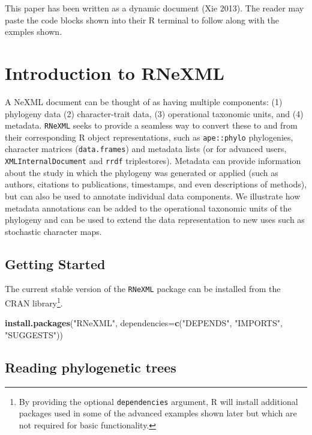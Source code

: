 \documentclass[author-year, review, 11pt]{components/elsarticle} %
\newenvironment{Shaded}{\begin{snugshade}}{\end{snugshade}}
\newcommand{\KeywordTok}[1]{\textcolor[rgb]{0.13,0.29,0.53}{\textbf{{#1}}}}
\newcommand{\DataTypeTok}[1]{\textcolor[rgb]{0.13,0.29,0.53}{{#1}}}
\newcommand{\StringTok}[1]{\textcolor[rgb]{0.31,0.60,0.02}{{#1}}}
\newcommand{\NormalTok}[1]{{#1}}
\begin{document}
This paper has been written as a dynamic document (Xie 2013). The reader
may paste the code blocks shown into their R terminal to follow along
with the exmples shown.

\section{Introduction to RNeXML}\label{introduction-to-rnexml}

A NeXML document can be thought of as having multiple components: (1)
phylogeny data (2) character-trait data, (3) operational taxonomic
units, and (4) metadata. \texttt{RNeXML} seeks to provide a seamless way
to convert these to and from their corresponding R object
representations, such as \texttt{ape::phylo} phylogenies, character
matrices (\texttt{data.frames}) and metadata lists (or for advanced
users, \texttt{XMLInternalDocument} and \texttt{rrdf} triplestores).
Metadata can provide information about the study in which the phylogeny
was generated or applied (such as authors, citations to publications,
timestamps, and even descriptions of methods), but can also be used to
annotate individual data components. We illustrate how metadata
annotations can be added to the operational taxonomic units of the
phylogeny and can be used to extend the data representation to new uses
such as stochastic character maps.

\subsection{Getting Started}\label{getting-started}

The current stable version of the \texttt{RNeXML} package can be
installed from the CRAN library\footnote{By providing the optional
  \texttt{dependencies} argument, R will install additional packages
  used in some of the advanced examples shown later but which are not
  required for basic functionality.}.

\begin{Shaded}
\begin{Highlighting}[]
\KeywordTok{install.packages}\NormalTok{(}\StringTok{"RNeXML"}\NormalTok{, }\DataTypeTok{dependencies=}\KeywordTok{c}\NormalTok{(}\StringTok{"DEPENDS"}\NormalTok{, }\StringTok{"IMPORTS"}\NormalTok{, }\StringTok{"SUGGESTS"}\NormalTok{))}
\end{Highlighting}
\end{Shaded}

\subsection{Reading phylogenetic
trees}\label{reading-phylogenetic-trees}
\end{document}
